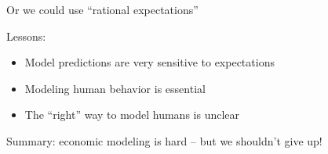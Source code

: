 \documentclass[
    xcolor={svgnames,dvipsnames},
    hyperref={colorlinks, citecolor=DeepPink4, linkcolor=DarkRed, urlcolor=DarkBlue}
    ]{beamer}  %
\newcommand{\1}{\mathbbm 1}
\begin{document}
\begin{frame}

    Or we could use ``rational expectations''
    
    \begin{figure}
        \centering
    \end{figure}

\end{frame}


\begin{frame}

    Lessons:
    \begin{itemize}
        \item Model predictions are very sensitive to expectations
            \vspace{1em}
        \item Modeling human behavior is essential
            \vspace{1em}
        \item The ``right'' way to model humans is unclear
    \end{itemize}
    
        \vspace{1em}
        \vspace{1em}
    Summary: economic modeling is hard -- but we shouldn't give up!

\end{frame}
\end{document}
